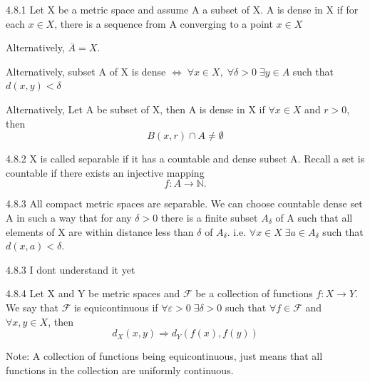 \documentclass[a4paper,norsk]{article}
\renewcommand{\epsilon}{\varepsilon}
\begin{document}
\begin{definitionbox}{4.8.1}{}
Let X be a metric space and assume A a subset of X. A is dense in X if for each $ x \in X $, there is a sequence from A converging to a point $ x \in X $


Alternatively, $ \overline{A} = X $. 


Alternatively, subset A of X is dense $ \iff \; \forall x \in X, \; \forall \delta > 0 \; \exists y \in A$  such that $ d \left( x, y \right) < \delta  $

Alternatively, Let A be subset of X, then A is dense in X if $ \forall x \in X $ and $ r > 0 $, then
\[
    B \left( x, r \right) \cap A \neq \emptyset
\]

\end{definitionbox}

\begin{definitionbox}{4.8.2}{}
X is called separable if it has a countable and dense subset A. Recall a set is countable if there exists an injective mapping
\[
    f : A \to \mathbb{N}.
\]
\end{definitionbox}



\begin{propositionbox}{4.8.3}{}
All compact metric spaces are separable. We can choose countable dense set A in such a way that for any $ \delta > 0 $ there is a finite subset $ A_{ \delta } $ of A such that all elements of X are within distance less than $ \delta  $ of $ A_{ \delta } $. i.e. $ \forall x \in X \; \exists a \in A_{ \delta } $ such that $ d \left( x, a \right) < \delta  $.

\begin{proofbox}{4.8.3}{}
  I dont understand it yet
\end{proofbox}
\end{propositionbox}

\begin{definitionbox}{4.8.4}{}
Let X and Y be metric spaces and $ \mathcal{F} $ be a collection of functions $ f: X \to Y $. We say that $ \mathcal{F} $ is equicontinuous if $ \forall  \epsilon > 0 \; \exists \delta > 0 $ such that $ \forall f \in \mathcal{F} $ and $ \forall x, y \in X $, then
\[
    d_X \left( x, y \right) \Rightarrow d_Y \left( f(x), f(y) \right) 
\]
\end{definitionbox}


Note: A collection of functions being equicontinuous, just means that all functions in the collection are uniformly continuous.
\end{document}
